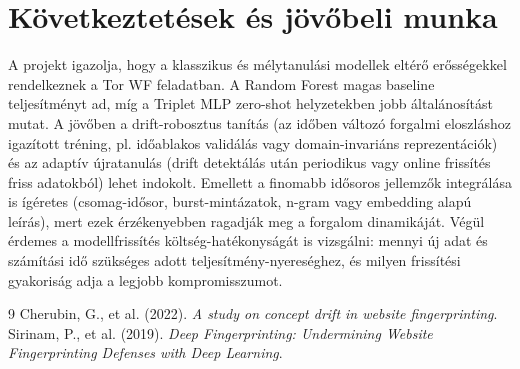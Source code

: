 \documentclass[a4paper,12pt]{article}
\begin{document}
\section{Következtetések és jövőbeli munka}
A projekt igazolja, hogy a klasszikus és mélytanulási modellek eltérő erősségekkel rendelkeznek
a Tor WF feladatban. A Random Forest magas baseline teljesítményt ad, míg a Triplet MLP
zero-shot helyzetekben jobb általánosítást mutat. A jövőben a drift-robosztus tanítás
(az időben változó forgalmi eloszláshoz igazított tréning, pl. időablakos validálás vagy
domain-invariáns reprezentációk) és az adaptív újratanulás (drift detektálás után
periodikus vagy online frissítés friss adatokból) lehet indokolt. Emellett a finomabb
idősoros jellemzők integrálása is ígéretes (csomag-idősor, burst-mintázatok, n-gram vagy
embedding alapú leírás), mert ezek érzékenyebben ragadják meg a forgalom dinamikáját.
Végül érdemes a modellfrissítés költség-hatékonyságát is vizsgálni: mennyi új adat és
számítási idő szükséges adott teljesítmény-nyereséghez, és milyen frissítési gyakoriság
adja a legjobb kompromisszumot.

\begin{thebibliography}{9}
    Cherubin, G., et al. (2022). \textit{A study on concept drift in website fingerprinting}.
    Sirinam, P., et al. (2019). \textit{Deep Fingerprinting: Undermining Website Fingerprinting Defenses with Deep Learning}.
\end{thebibliography}
\end{document}

